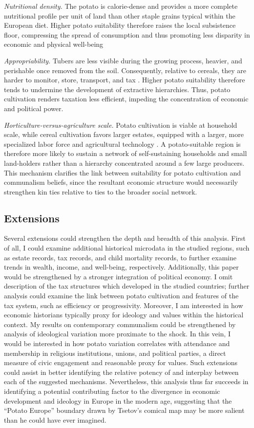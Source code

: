 \documentclass[11pt]{article}
\begin{document}
\textit{Nutritional density.} The potato is calorie-dense and provides a more complete nutritional profile per unit of land than other staple grains typical within the European diet. Higher potato suitability therefore raises the local subsistence floor, compressing the spread of consumption and thus promoting less disparity in economic and physical well-being

\textit{Appropriability.} Tubers are less visible during the growing process, heavier, and perishable once removed from the soil. Consequently, relative to cereals, they are harder to monitor, store, transport, and tax \citep{MaysharMoavPascali2022}. Higher potato suitability therefore tends to undermine the development of extractive hierarchies. Thus, potato cultivation renders taxation less efficient, impeding the concentration of economic and political power.

\textit{Horticulture-versus-agriculture scale.} Potato cultivation is viable at household scale, while cereal cultivation favors larger estates, equipped with a larger, more specialized labor force and agricultural technology \citep{AlesinaGiulianoNunn2013}. A potato-suitable region is therefore more likely to sustain a network of self-sustaining households and small land-holders rather than a hierarchy concentrated around a few large producers. This mechanism clarifies the link between suitability for potato cultivation and communalism beliefs, since the resultant economic structure would necessarily strengthen kin ties relative to ties to the broader social network.

\subsection{Extensions}
Several extensions could strengthen the depth and breadth of this analysis. First of all, I could examine additional historical microdata in the studied regions, such as estate records, tax records, and child mortality records, to further examine trends in wealth, income, and well-being, respectively. Additionally, this paper would be strengthened by a stronger integration of political economy. I omit description of the tax structures which developed in the studied countries; further analysis could examine the link between potato cultivation and features of the tax system, such as efficiency or progressivity. Moreover, I am interested in how economic historians typically proxy for ideology and values within the historical context. My results on contemporary communalism could be strengthened by analysis of ideological variation more proximate to the shock. In this vein, I would be interested in how potato variation correlates with attendance and membership in religious institutions, unions, and political parties, a direct measure of civic engagement and reasonable proxy for values. Such extensions could assist in better identifying the relative potency of and interplay between each of the suggested mechanisms. Nevertheless, this analysis thus far succeeds in identifying a potential contributing factor to the divergence in economic development and ideology in Europe in the modern age, suggesting that the ``Potato Europe'' boundary drawn by Tsetov's comical map may be more salient than he could have ever imagined.

\clearpage




\end{document}
